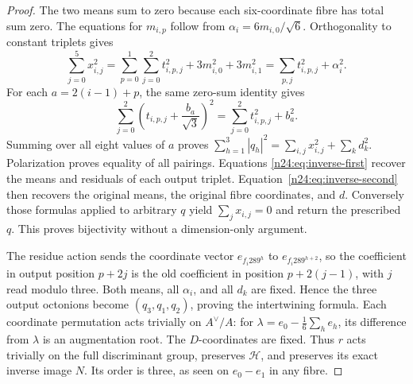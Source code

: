 \begin{proof}
The two means sum to zero because each six-coordinate fibre has total
sum zero.  The equations for \(m_{i,p}\) follow from
\(\alpha_i=6m_{i,0}/\sqrt6\).  Orthogonality to constant triplets gives
\[
 \sum_{j=0}^5x_{i,j}^2
 =\sum_{p=0}^1\sum_{j=0}^2t_{i,p,j}^2
                    +3m_{i,0}^2+3m_{i,1}^2
 =\sum_{p,j}t_{i,p,j}^2+\alpha_i^2.
\]
For each \(a=2(i-1)+p\), the same zero-sum identity gives
\[
 \sum_{j=0}^2\left(t_{i,p,j}+\frac{b_a}{\sqrt3}\right)^2
                      =\sum_{j=0}^2t_{i,p,j}^2+b_a^2.
\]
Summing over all eight values of \(a\) proves
\(\sum_{h=1}^3|q_h|^2=\sum_{i,j}x_{i,j}^2+\sum_kd_k^2\).
Polarization proves equality of all pairings.  Equations
\eqref{n24:eq:inverse-first} recover the means and residuals of each
output triplet.  Equation~\eqref{n24:eq:inverse-second} then recovers
the original means, the original fibre coordinates, and \(d\).
Conversely those formulas applied to arbitrary \(q\) yield
\(\sum_jx_{i,j}=0\) and return the prescribed \(q\).  This proves
bijectivity without a dimension-only argument.

The residue action sends the coordinate vector \(e_{f_i289^h}\)
to \(e_{f_i289^{h+2}}\), so the coefficient in output position
\(p+2j\) is the old coefficient in position \(p+2(j-1)\), with
\(j\) read modulo three.  Both means, all \(\alpha_i\), and all
\(d_k\) are fixed.  Hence the three output octonions become
\((q_3,q_1,q_2)\), proving the intertwining formula.  Each coordinate
permutation acts trivially on \(A^\vee/A\): for
\(\lambda=e_0-\frac16\sum_he_h\), its difference from \(\lambda\)
is an augmentation root.  The \(D\)-coordinates are fixed.  Thus
\(r\) acts trivially on the full discriminant group, preserves
\(\mathcal H\), and preserves its exact inverse image \(N\).
Its order is three, as seen on \(e_0-e_1\) in any fibre.
\end{proof}

